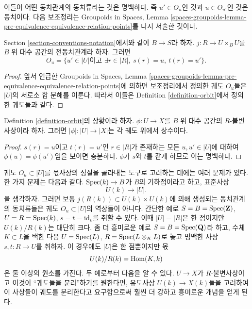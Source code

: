 \noindent
이들이 어떤 동치관계의 동치류라는 것은 명백하다. 즉
$u' \in O_u$인 것과 $u \in O_{u'}$인 것은 동치이다.
다음 보조정리는 Groupoids in Spaces, Lemma
\ref{spaces-groupoids-lemma-pre-equivalence-equivalence-relation-points}를
다시 서술한 것이다.

\begin{lemma}
\label{lemma-pre-equivalence-equivalence-relation-points}
Section \ref{section-conventions-notation}에서와 같이 $B \to S$라 하자.
$j : R \to U \times_B U$를 $B$ 위 대수 공간의 전동치관계라 하자. 그러면
$$
O_u =
\{u' \in |U| \text{이고 } \exists r \in |R|, \ s(r) = u, \ t(r) = u'\}.
$$
\end{lemma}

\begin{proof}
앞서 언급한 Groupoids in Spaces, Lemma
\ref{spaces-groupoids-lemma-pre-equivalence-equivalence-relation-points}에
의하면 보조정리에서 정의한 궤도 $O_u$들은 $|U|$의 서로소 합 분해를
이룬다. 따라서 이들은 Definition \ref{definition-orbit}에서 정의한
궤도들과 같다.
\end{proof}

\begin{lemma}
\label{lemma-invariant-map-constant-on-orbit}
Definition \ref{definition-orbit}의 상황이라 하자.
$\phi : U \to X$를 $B$ 위 대수 공간의 $R$-불변사상이라 하자.
그러면 $|\phi| : |U| \to |X|$는 각 궤도 위에서 상수이다.
\end{lemma}

\begin{proof}
$s(r) = u$이고 $t(r) = u'$인 $r \in |R|$가 존재하는 모든
$u, u' \in |U|$에 대하여 $\phi(u) = \phi(u')$임을 보이면 충분하다.
$\phi$가 $s$와 $t$를 같게 하므로 이는 명백하다.
\end{proof}

\noindent
궤도 $O_u \subset |U|$를 몫사상의 성질을 골라내는 도구로
고려하는 데에는 여러 문제가 있다. 한 가지 문제는 다음과 같다.
$\mathop{\mathrm{Spec}}(k) \to B$가 $B$의 기하점이라고 하고, 표준사상
$$
U(k) \longrightarrow |U|.
$$
을 생각하자. 그러면 보통 $j(R(k)) \subset U(k) \times U(k)$에 의해
생성되는 동치관계의 동치류들은 궤도 $O_u \subset |U|$의 역상들이 아니다.
간단한 예로 $S = B = \mathop{\mathrm{Spec}}(\mathbf{Z})$,
$U = R = \mathop{\mathrm{Spec}}(k)$, $s = t = \text{id}_k$를 취할 수 있다.
이때 $|U| = |R|$은 한 점이지만 $U(k)/R(k)$는 대단히 크다.
좀 더 흥미로운 예로 $S = B = \mathop{\mathrm{Spec}}(\mathbf{Q})$라 하고,
수체 $K \subset L$을 택한 다음 $U = \mathop{\mathrm{Spec}}(L)$,
$R = \mathop{\mathrm{Spec}}(L \otimes_K L)$로 놓고 명백한 사상 $s, t : R \to U$를 취하자.
이 경우에도 $|U|$은 한 점뿐이지만 몫
$$
U(k)/R(k) = \mathop{\mathrm{Hom}}\nolimits(K, k)
$$
은 둘 이상의 원소를 가진다. 두 예로부터 다음을 알 수 있다.
$U \to X$가 $R$-불변사상이고 이것이 “궤도들을 분리”하기를 원한다면,
유도사상 $U(k) \to X(k)$들을 고려하여 이 사상들이 궤도를 분리한다고
요구함으로써 훨씬 더 강하고 흥미로운 개념을 얻게 된다.

